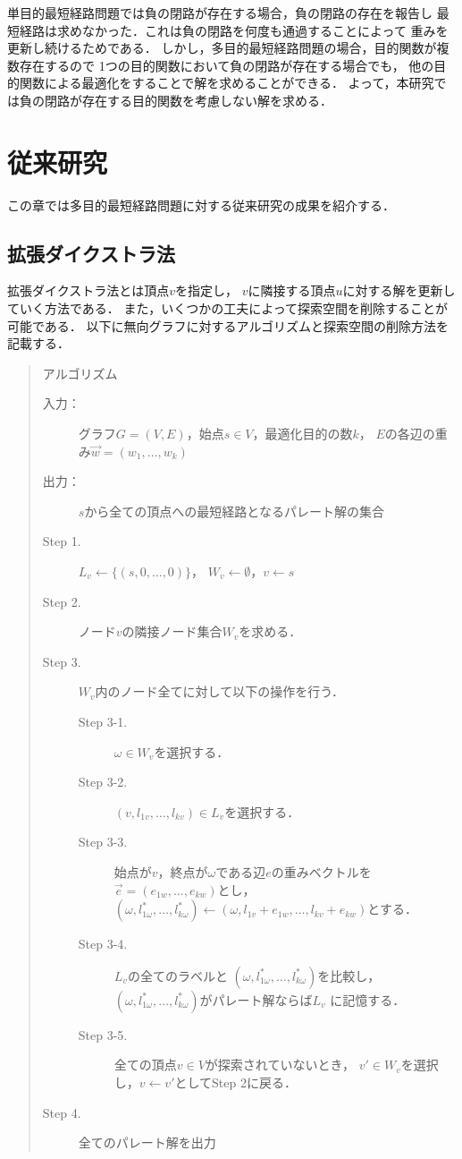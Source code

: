 \documentclass[12pt]{optlab-bachelor}
\begin{document}
単目的最短経路問題では負の閉路が存在する場合，負の閉路の存在を報告し
最短経路は求めなかった．これは負の閉路を何度も通過することによって
重みを更新し続けるためである．
しかし，多目的最短経路問題の場合，目的関数が複数存在するので
1つの目的関数において負の閉路が存在する場合でも，
他の目的関数による最適化をすることで解を求めることができる．
よって，本研究では負の閉路が存在する目的関数を考慮しない解を求める．

\chapter{従来研究}
この章では多目的最短経路問題に対する従来研究の成果を紹介する．

\section{拡張ダイクストラ法}
拡張ダイクストラ法とは頂点$v$を指定し，
$v$に隣接する頂点$u$に対する解を更新していく方法である．
また，いくつかの工夫によって探索空間を削除することが可能である．
以下に無向グラフに対するアルゴリズムと探索空間の削除方法を記載する．

\begin{quote}
  アルゴリズム
  \begin{description}
    \item[入力：] グラフ$G=(V,E)$，始点$s \in V$，最適化目的の数$k$，
    $E$の各辺の重み$\vec{w}=(w_1,\ldots,w_k)$
    \item[出力：] $s$から全ての頂点への最短経路となるパレート解の集合
    \item[Step 1.] $L_v \leftarrow \{(s,0,\ldots,0)\}$，
    $W_v \leftarrow \emptyset$，$v \leftarrow s$
    \item[Step 2.] ノード$v$の隣接ノード集合$W_v$を求める．
    \item[Step 3.] $W_v$内のノード全てに対して以下の操作を行う．
    \begin{description}
      \item[Step 3-1.] $\omega \in W_v$を選択する．
      \item[Step 3-2.] $(v,l_{1v},\ldots,l_{kv}) \in L_v$を選択する．
      \item[Step 3-3.] 始点が$v$，終点が$\omega$である辺$e$の重みベクトルを
      $\vec{e} = (e_{1w},\ldots,e_{kw})$とし，
      $(\omega,l^*_{1\omega},\ldots,l^*_{k\omega}) \leftarrow
      (\omega,l_{1v}+e_{1w},\ldots,l_{kv}+e_{kw})$とする．
      \item[Step 3-4.] $L_v$の全てのラベルと
      $(\omega,l^*_{1\omega},\ldots,l^*_{k\omega})$を比較し，
      $(\omega,l^*_{1\omega},\ldots,l^*_{k\omega})$がパレート解ならば$L_v$
      に記憶する．
      \item[Step 3-5.] 全ての頂点$v \in V$が探索されていないとき，
      $v' \in W_v$を選択し，$v \leftarrow v'$としてStep 2に戻る．
    \end{description}
    \item[Step 4.] 全てのパレート解を出力
  \end{description}
\end{quote}
\end{document}
